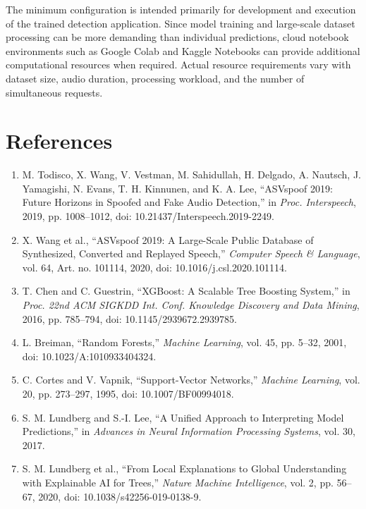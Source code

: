 \documentclass[12pt,a4paper]{report}
\begin{document}
The minimum configuration is intended primarily for development and execution of the trained detection application. Since model training and large-scale dataset processing can be more demanding than individual predictions, cloud notebook environments such as Google Colab and Kaggle Notebooks can provide additional computational resources when required. Actual resource requirements vary with dataset size, audio duration, processing workload, and the number of simultaneous requests.


\chapter{References}

\begin{enumerate}
    \renewcommand{\labelenumi}{[\theenumi]}

    \item M. Todisco, X. Wang, V. Vestman, M. Sahidullah, H. Delgado, A. Nautsch, J. Yamagishi, N. Evans, T. H. Kinnunen, and K. A. Lee, ``ASVspoof 2019: Future Horizons in Spoofed and Fake Audio Detection,'' in \textit{Proc. Interspeech}, 2019, pp. 1008--1012, doi: 10.21437/Interspeech.2019-2249.

    \item X. Wang et al., ``ASVspoof 2019: A Large-Scale Public Database of Synthesized, Converted and Replayed Speech,'' \textit{Computer Speech \& Language}, vol. 64, Art. no. 101114, 2020, doi: 10.1016/j.csl.2020.101114.

    \item T. Chen and C. Guestrin, ``XGBoost: A Scalable Tree Boosting System,'' in \textit{Proc. 22nd ACM SIGKDD Int. Conf. Knowledge Discovery and Data Mining}, 2016, pp. 785--794, doi: 10.1145/2939672.2939785.

    \item L. Breiman, ``Random Forests,'' \textit{Machine Learning}, vol. 45, pp. 5--32, 2001, doi: 10.1023/A:1010933404324.

    \item C. Cortes and V. Vapnik, ``Support-Vector Networks,'' \textit{Machine Learning}, vol. 20, pp. 273--297, 1995, doi: 10.1007/BF00994018.

    \item S. M. Lundberg and S.-I. Lee, ``A Unified Approach to Interpreting Model Predictions,'' in \textit{Advances in Neural Information Processing Systems}, vol. 30, 2017.

    \item S. M. Lundberg et al., ``From Local Explanations to Global Understanding with Explainable AI for Trees,'' \textit{Nature Machine Intelligence}, vol. 2, pp. 56--67, 2020, doi: 10.1038/s42256-019-0138-9.


\end{enumerate}
\end{document}
